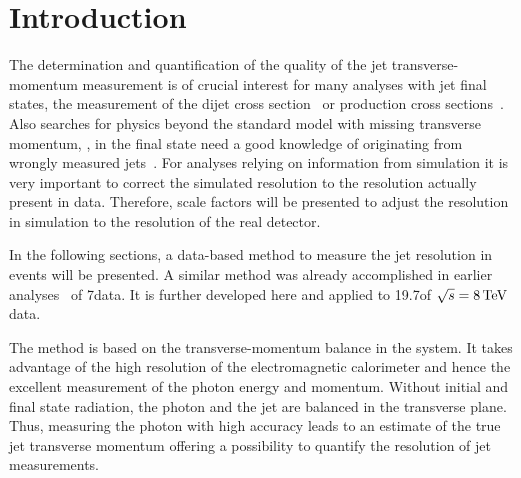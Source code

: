 \chapter{Introduction}
\label{res:ch:Introduction}

The determination and quantification of the quality of the jet transverse-momentum measurement is of crucial interest for many analyses with jet final states, \eg the measurement of the dijet cross section~\cite{bib:CMS:QCD_measurements} or \ttbar production cross sections~\cite{bib:CMS:TopCrossSection_8TeV}. 
Also searches for physics beyond the standard model with missing transverse momentum, \PTm, in the final state need a good knowledge of \PTm originating from wrongly measured jets~\cite{bib:CMS:RA2_8TeV,bib:CMS:MT2_8TeV,bib:CMS:AlphaT_8TeV}.
For analyses relying on information from simulation it is very important to correct the simulated resolution to the resolution actually present in data.
Therefore, scale factors will be presented to adjust the resolution in simulation to the resolution of the real detector.  
  
In the following sections, a data-based method to measure the jet \pt resolution in \GAMJET events will be presented. 
A similar method was already accomplished in earlier analyses~\cite{bib:CMS:JERCPaper_2011,CMS:PAS:JETResolution_7TeV} of 7\tev data.  
It is further developed here and applied to 19.7\fbinv of $\sqrt{s}=8\,\text{Te}\kern-0.06667em\text{V}$ data.

The method is based on the transverse-momentum balance in the \GAMJET system. 
It takes advantage of the high resolution of the electromagnetic calorimeter and hence the excellent measurement of the photon energy and momentum.
Without initial and final state radiation, the photon and the jet are balanced in the transverse plane. 
Thus, measuring the photon \pt with high accuracy leads to an estimate of the true jet transverse momentum offering a possibility to quantify the resolution of jet \pt measurements.


